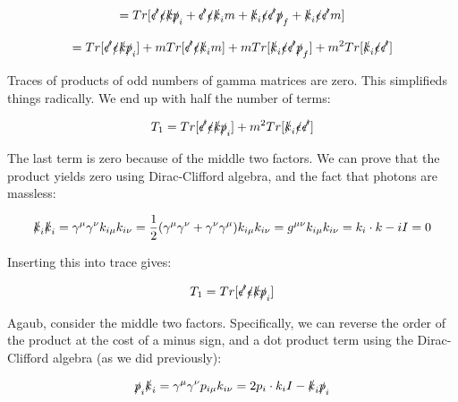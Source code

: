 \documentclass[a4]{article}
\begin{document}
    \begin{equation}
        = Tr [\slashed{\epsilon'} \slashed{\epsilon} \slashed{k} \slashed{p}_i + \slashed{\epsilon'} \slashed{\epsilon} \slashed{k}_i m + \slashed{k}_i \slashed{\epsilon} \slashed{\epsilon'} \slashed{p}_f + \slashed{k}_i \slashed{\epsilon} \slashed{\epsilon'} m]
    \end{equation}

    \begin{equation}
        = Tr [\slashed{\epsilon'} \slashed{\epsilon} \slashed{k} \slashed{p}_i] + m Tr[\slashed{\epsilon'} \slashed{\epsilon} \slashed{k}_i m] + m Tr[\slashed{k}_i \slashed{\epsilon} \slashed{\epsilon'} \slashed{p}_f] + m^2 Tr[\slashed{k}_i \slashed{\epsilon} \slashed{\epsilon'}]
    \end{equation}

    Traces of products of odd numbers of gamma matrices are zero. This simplifieds things radically. We end up with half the number of terms:

    \begin{equation}
        T_1 = Tr [\slashed{\epsilon'} \slashed{\epsilon} \slashed{k} \slashed{p}_i] + m^2 Tr[\slashed{k}_i \slashed{\epsilon} \slashed{\epsilon'}]
    \end{equation}

    The last term is zero because of the middle two factors. We can prove that the product yields zero using Dirac-Clifford algebra, and the fact that photons are massless:

    \begin{equation}
        \slashed{k}_i \slashed{k}_i = \gamma^\mu \gamma^\nu k_{i \mu} k_{i \nu} = \frac{1}{2} (\gamma^\mu \gamma^\nu + \gamma^\nu \gamma^\mu) k_{i \mu} k_{i \nu} = g^{\mu \nu} k_{i \mu} k_{i \nu} = k_i \cdot k-i I = 0
    \end{equation}

    Inserting this into trace gives:

    \begin{equation}
        T_1 = Tr [\slashed{\epsilon'} \slashed{\epsilon} \slashed{k} \slashed{p}_i]
    \end{equation}

    Agaub, consider the middle two factors. Specifically, we can reverse the order of the product at the cost of a minus sign, and a dot product term using the Dirac-Clifford algebra
    (as we did previously):

    \begin{equation}
        \slashed{p}_i \slashed{k}_i = \gamma^{\mu} \gamma^{\nu} p_{i \mu} k_{i \nu} = 2 p_i \cdot k_i I - \slashed{k}_i \slashed{p}_i
    \end{equation}
\end{document}
